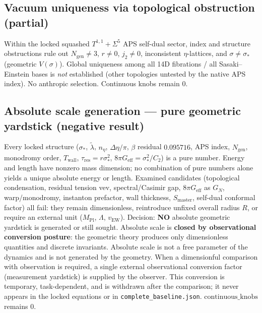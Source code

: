 \documentclass{article}
\begin{document}
\subsection{Vacuum uniqueness via topological obstruction (partial)}
Within the locked squashed $T^{1,1}+\Sigma^5$ APS self-dual sector, index and
structure obstructions rule out $N_{\mathrm{gen}}\neq 3$, $r\neq 0$, $j_2\neq 0$,
inconsistent $\eta$-lattices, and $\sigma\neq\sigma_*$ (geometric $V(\sigma)$).
Global uniqueness among all 14D fibrations / all Sasaki--Einstein bases is
\emph{not} established (other topologies untested by the native APS index).
No anthropic selection. Continuous knobs remain 0.

\subsection{Absolute scale generation --- pure geometric yardstick (negative result)}
Every locked structure ($\sigma_*$, $\tilde\lambda$, $n_\eta$, $\Delta\eta/\pi$,
$\beta$ residual $0.095716$, APS index, $N_{\mathrm{gen}}$, monodromy order,
$T_{\mathrm{wall}}$, $\tau_{\mathrm{res}}=r\sigma_*^2$,
$8\pi G_{\mathrm{eff}}=\sigma_*^2/C_2$) is a pure number. Energy and length
have nonzero mass dimension; no combination of pure numbers alone yields a unique
absolute energy or length. Examined candidates (topological condensation, residual
tension vev, spectral/Casimir gap, $8\pi G_{\mathrm{eff}}$ as $G_N$, warp/monodromy,
instanton prefactor, wall thickness, $S_{\mathrm{master}}$, self-dual conformal
factor) all fail: they remain dimensionless, reintroduce unfixed overall radius $R$,
or require an external unit ($M_{\mathrm{Pl}}$, $\Lambda$, $v_{\mathrm{EW}}$).
Decision: \textbf{NO} absolute geometric yardstick is generated or still sought.
Absolute scale is \textbf{closed by observational conversion posture}:
the geometric theory produces only dimensionless quantities and discrete invariants.
Absolute scale is not a free parameter of the dynamics and is not generated by the geometry.
When a dimensionful comparison with observation is required, a single external
observational conversion factor (measurement yardstick) is supplied by the observer.
This conversion is temporary, task-dependent, and is withdrawn after the comparison;
it never appears in the locked equations or in \texttt{complete\_baseline.json}.
$\mathrm{continuous\_knobs}$ remains 0.
\end{document}
